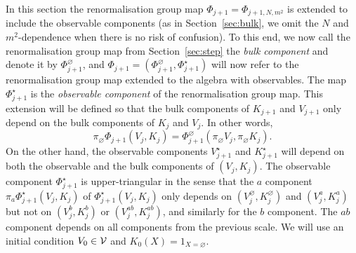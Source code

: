 \documentclass[11pt]{amsart}
\numberwithin{equation}{section}
\numberwithin{theorem}{section}
\newcommand{\1}{{\bf 1}}
\newcommand{\obs}{\star}
\newcommand{\Vbulk}{V^\varnothing}
\newcommand{\Vobs}{V^\obs}
\newcommand{\Kbulk}{K^\varnothing}
\newcommand{\Kobs}{K^\obs}
\begin{document}
In this section the renormalisation group map $\Phi_{j+1}
=\Phi_{j+1,N,m^{2}}$ is extended to
include the observable components (as in Section~\ref{sec:bulk}, we
omit the $N$ and $m^{2}$-dependence when there is no risk of
confusion). To this end, we now call the
renormalisation group map from Section~\ref{sec:step} the \emph{bulk
  component} and denote it by $\Phi^\varnothing_{j+1}$, and 
$\Phi_{j+1}=(\Phi^\varnothing_{j+1},\Phi^\obs_{j+1})$ will now refer to
the renormalisation group map extended to the algebra with
observables.  The map $\Phi^\obs_{j+1}$ is the \emph{observable component} of
the renormalisation group map.  This extension will be defined so that the
bulk components of $K_{j+1}$ and $V_{j+1}$ only depend on the
bulk components of $K_j$ and $V_j$.  In other words,
\begin{equation}
  \pi_\varnothing \Phi_{j+1}(V_j,K_j) = \Phi_{j+1}^\varnothing(\pi_\varnothing V_j,\pi_\varnothing K_j).
\end{equation}
On the other hand, the observable components $\Vobs_{j+1}$ and
$\Kobs_{j+1}$ will depend on both the observable and the bulk
components of $(V_j,K_j)$.  The observable component $\Phi^{\obs}_{j+1}$ is
upper-triangular in the sense
that the $a$ component $\pi_{a}\Phi^{\obs}_{j+1}(V_{j},K_{j})$
of $\Phi^{\obs}_{j+1}(V_j,K_j)$ only depends on $(\Vbulk_{j},\Kbulk_{j})$ and
$(V^a_{j},K^a_{j})$ but not on $(V^b_{j},K^b_{j})$ or $(V^{ab}_{j},K^{ab}_{j})$, and similarly
for the $b$ component.  The $ab$ component depends on all components
from the previous scale.
We will use an initial condition $V_{0}\in \mathcal V$ and $K_{0}(X)=1_{X=\varnothing}$. 
\end{document}
